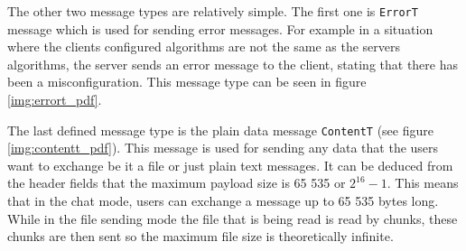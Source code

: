 The other two message types are relatively simple. The first one is \texttt{ErrorT} message which is used for sending error messages. For example in a situation where the clients configured algorithms are not the same as the servers algorithms, the server sends an error message to the client, stating that there has been a misconfiguration. This message type can be seen in figure \ref{img:errort_pdf}.

The last defined message type is the plain data message \texttt{ContentT} (see figure \ref{img:contentt_pdf}). This message is used for sending any data that the users want to exchange be it a file or just plain text messages. It can be deduced from the header fields that the maximum payload size is 65 535 or $2^{16}-1$. This means that in the chat mode, users can exchange a message up to 65 535 bytes long. While in the file sending mode the file that is being read is read by chunks, these chunks are then sent so the maximum file size is theoretically infinite.

